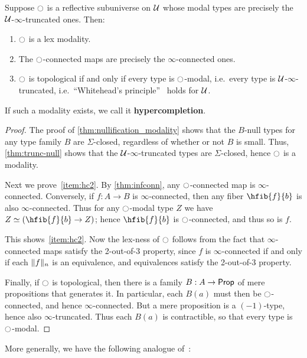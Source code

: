 \begin{thm}\label{thm:hypercompletion}
  Suppose $\modal$ is a reflective subuniverse on $\UU$ whose modal types are precisely the $\UU$-$\infty$-truncated ones.
  Then:
  \begin{enumerate}
  \item $\modal$ is a lex modality.\label{item:hc1}
  \item The $\modal$-connected maps are precisely the $\infty$-connected ones.\label{item:hc2}
  \item $\modal$ is topological if and only if every type is $\modal$-modal, i.e.\ every type is $\UU$-$\infty$-truncated, i.e.\ ``Whitehead's principle''~\cite[\S8.6]{TheBook} holds for $\UU$.\label{item:hc3}
  \end{enumerate}
  If such a modality exists, we call it \textbf{hypercompletion}.
\end{thm}
\begin{proof}
  The proof of \cref{thm:nullification_modality} shows that the $B$-null types for any type family $B$ are $\Sigma$-closed, regardless of whether or not $B$ is small.
  Thus, \cref{thm:trunc-null} shows that the $\UU$-$\infty$-truncated types are $\Sigma$-closed, hence $\modal$ is a modality.

  Next we prove~\ref{item:hc2}.
  By \cref{thm:infconn}, any $\modal$-connected map is $\infty$-connected.
  Conversely, if $f:A\to B$ is $\infty$-connected, then any fiber $\hfib{f}{b}$ is also $\infty$-connected.
  Thus for any $\modal$-modal type $Z$ we have $Z \eqvsym (\hfib{f}{b}\to Z)$; hence $\hfib{f}{b}$ is $\modal$-connected, and thus so is $f$.

  This shows~\ref{item:hc2}.
  Now the lex-ness of $\modal$ follows from the fact that $\infty$-connected maps satisfy the 2-out-of-3 property, since $f$ is $\infty$-connected if and only if each $\trunc n f$ is an equivalence, and equivalences satisfy the 2-out-of-3 property.

  Finally, if $\modal$ is topological, then there is a family $B:A\to \prop$ of mere propositions that generates it.
  In particular, each $B(a)$ must then be $\modal$-connected, and hence $\infty$-connected.
  But a mere proposition is a $(-1)$-type, hence also $\infty$-truncated.
  Thus each $B(a)$ is contractible, so that every type is $\modal$-modal.
\end{proof}

More generally, we have the following analogue of~\cite[Proposition 6.5.2.16]{lurie2009higher}:

